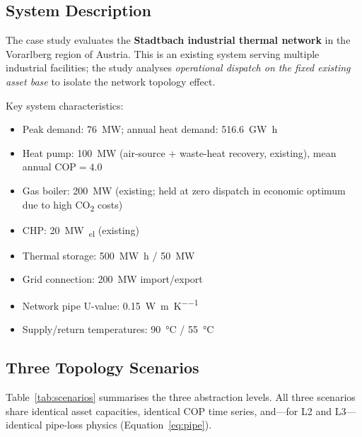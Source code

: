 \documentclass[a4paper,fleqn]{cas-sc}
\newcommand{\COP}{\mathrm{COP}}
\begin{document}
\subsection{System Description}

The case study evaluates the \textbf{Stadtbach industrial thermal network}
in the Vorarlberg region of Austria.  This is an existing system serving
multiple industrial facilities; the study analyses \emph{operational
dispatch on the fixed existing asset base} to isolate the network
topology effect.

Key system characteristics:

\begin{itemize}
  \item Peak demand: \SI{76}{\mega\watt};
        annual heat demand: \SI{516.6}{\giga\watt\hour}
  \item Heat pump: \SI{100}{\mega\watt} (air-source + waste-heat recovery,
        existing), mean annual $\COP = 4.0$
  \item Gas boiler: \SI{200}{\mega\watt} (existing; held at zero dispatch
        in economic optimum due to high CO\textsubscript{2} costs)
  \item CHP: \SI{20}{\mega\watt\textsubscript{el}} (existing)
  \item Thermal storage: \SI{500}{\mega\watt\hour} / \SI{50}{\mega\watt}
  \item Grid connection: \SI{200}{\mega\watt} import/export
  \item Network pipe U-value: \SI{0.15}{\watt\per\metre\per\kelvin}
  \item Supply/return temperatures: \SI{90}{\degreeCelsius} / \SI{55}{\degreeCelsius}
\end{itemize}

\subsection{Three Topology Scenarios}

Table~\ref{tab:scenarios} summarises the three abstraction levels.  All
three scenarios share identical asset capacities, identical COP time series,
and---for L2 and L3---identical pipe-loss physics (Equation~\ref{eq:pipe}).
\end{document}
